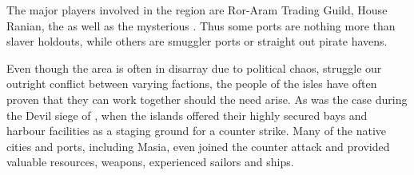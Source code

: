 The major players involved in the region are Ror-Aram Trading Guild, House
Ranian, the  as well as the mysterious
. Thus some ports are nothing more than slaver
holdouts, while others are smuggler ports or straight out pirate havens.

Even though the area is often in disarray due to political chaos, struggle our
outright conflict between varying factions, the people of the isles have often
proven that they can work together should the need arise. As was the case during
the Devil siege of , when the islands offered their highly
secured bays and harbour facilities as a staging ground for a counter strike.
Many of the native cities and ports, including Masia, even joined the counter
attack and provided valuable resources, weapons, experienced sailors and ships.
